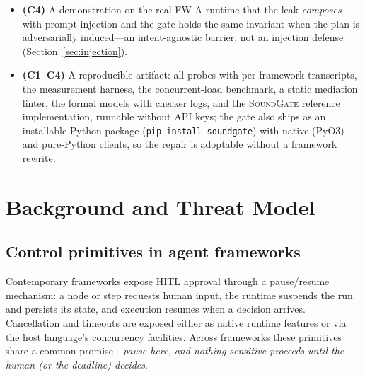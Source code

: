 \documentclass[10pt,journal,compsoc]{IEEEtran}
\newcommand{\sys}{\textsc{SoundGate}}
\begin{document}
\begin{itemize}[leftmargin=1.2em]
fail-closed refusals of legitimate writes, and a single-node concurrent-load
evaluation including durable (WAL)
mode (Sections~\ref{sec:design}--\ref{sec:eval}).
\item \textbf{(C4)} A demonstration on the real \textsf{FW-A} runtime that the
leak \emph{composes} with prompt injection and the gate holds the same
invariant when the plan is adversarially induced---an intent-agnostic barrier,
not an injection defense (Section~\ref{sec:injection}).
\item \textbf{(C1--C4)} A reproducible artifact: all probes with per-framework
transcripts, the measurement harness, the concurrent-load benchmark, a static
mediation linter, the formal models with checker logs, and the \sys{} reference
implementation, runnable without API keys; the gate also ships as an installable
Python package (\texttt{pip install soundgate}) with native (PyO3) and
pure-Python clients, so the repair is adoptable without a framework rewrite.
\end{itemize}

\section{Background and Threat Model}
\label{sec:background}

\subsection{Control primitives in agent frameworks}
Contemporary frameworks expose HITL approval through a pause/resume mechanism:
a node or step requests human input, the runtime suspends the run and persists
its state, and execution resumes when a decision arrives. Cancellation and
timeouts are exposed either as native runtime features or via the host
language's concurrency facilities. Across frameworks these primitives share a
common promise---\emph{pause here, and nothing sensitive proceeds until the human
(or the deadline) decides}.
\end{document}
